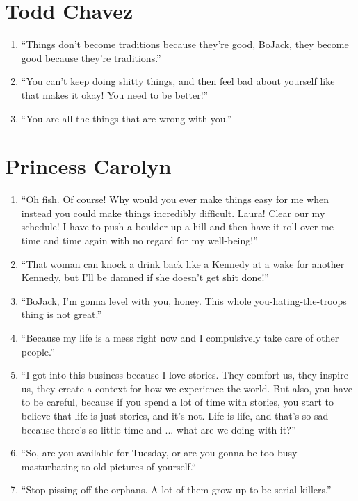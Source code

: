\documentclass{book}
\numberwithin{equation}{section}
\begin{document}
\section{Todd Chavez}
\begin{enumerate}
    \item ``Things don't become traditions because they're good, BoJack, they become good because they're traditions.''
    \item ``You can't keep doing shitty things, and then feel bad about yourself like that makes it okay! You need to be better!''
    \item ``You are all the things that are wrong with you.''
\end{enumerate}

\section{Princess Carolyn}
\begin{enumerate}
    \item ``Oh fish. Of course! Why would you ever make things easy for me when instead you could make things incredibly difficult. Laura! Clear our my schedule! I have to push a boulder up a hill and then have it roll over me time and time again with no regard for my well-being!''
    \item ``That woman can knock a drink back like a Kennedy at a wake for another Kennedy, but I'll be damned if she doesn't get shit done!''
    \item ``BoJack, I'm gonna level with you, honey. This whole you-hating-the-troops thing is not great.''
    \item ``Because my life is a mess right now and I compulsively take care of other people.''
    \item ``I got into this business because I love stories. They comfort us, they inspire us, they create a context for how we experience the world. But also, you have to be careful, because if you spend a lot of time with stories, you start to believe that life is just stories, and it's not. Life is life, and that's so sad because there's so little time and ... what are we doing with it?''
    \item ``So, are you available for Tuesday, or are you gonna be too busy masturbating to old pictures of yourself.``
    \item ``Stop pissing off the orphans. A lot of them grow up to be serial killers.''
\end{enumerate}
\end{document}
